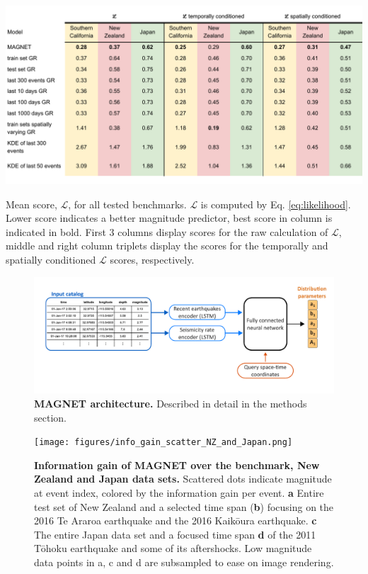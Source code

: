 \documentclass[pdflatex]{sn-jnl}
\begin{document}
\newpage
\begin{table}[h!]
    \centering
    \includegraphics[width=1\textwidth]{figures/score_tables_EM.pdf}
    \caption{Mean score, $\mathcal{L}$, for all tested benchmarks. $\mathcal{L}$ is computed by Eq. \ref{eq:likelihood}. Lower score indicates a better magnitude predictor, best score in column is indicated in bold. First 3 columns display scores for the raw calculation of $\mathcal{L}$, middle and right column triplets display the scores for the temporally and spatially conditioned $\mathcal{L}$ scores, respectively.
    }
    \label{tab:mean_ll_all_benchmarks}
\end{table}



\newpage
\begin{figure}[h!]
    \centering
    \includegraphics[width=1\textwidth]{figures/detailed_architecture.pdf}
    \caption{\textbf{MAGNET architecture.} Described in detail in the methods section.}
    \label{fig:architecture}
\end{figure}

\newpage
\begin{figure}[h!]
	\centering
        \texttt{[image: figures/info\_gain\_scatter\_NZ\_and\_Japan.png]}
	\caption{
            \textbf{Information gain of MAGNET over the benchmark, New Zealand and Japan data sets.} Scattered dots indicate magnitude at event index, colored by the information gain per event. \textbf{a} Entire test set of New Zealand and a selected time span (\textbf{b}) focusing on the 2016 Te Araroa earthquake and the 2016 Kaikōura earthquake. \textbf{c} The entire Japan data set and a focused time span \textbf{d} of the 2011 Tōhoku earthquake and some of its aftershocks. Low magnitude data points in a, c and d are subsampled to ease on image rendering.
         }
\label{fig:nz_japan_info_gain}
\end{figure}
\end{document}
